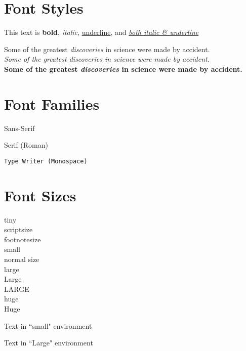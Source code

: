 \documentclass{article}
\begin{document}
\section{Font Styles}

This text is \textbf{bold},
\textit{italic},
\underline{underline}, and
\textit{\underline{both italic \& underline}}


Some of the greatest \emph{discoveries} in science
were made by accident.\\
\textit{Some of the greatest \emph{discoveries}
in science were made by accident.}\\
\textbf{Some of the greatest \emph{discoveries}
in science were made by accident.}



\section{Font Families}

\textsf{Sans-Serif}

\textrm{Serif (Roman)}

\texttt{Type Writer (Monospace)}



\section{Font Sizes}

{\tiny tiny}\\
{\scriptsize scriptsize}\\
{\footnotesize footnotesize}\\
{\small small}\\
{\normalsize normal size}\\
{\large large}\\
{\Large Large}\\
{\LARGE LARGE}\\
{\huge huge}\\
{\Huge Huge}

\begin{small}
    Text in ``small" environment
\end{small}

\begin{Large}
    Text in ``Large" environment
\end{Large}
\end{document}
